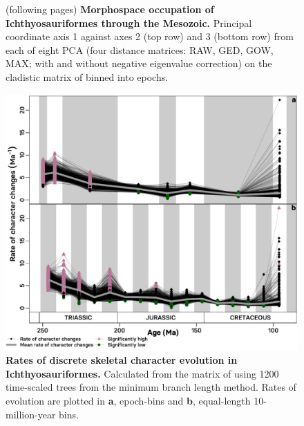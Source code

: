 \documentclass[british,a4paper]{article}
\begin{document}

\FloatBarrier

\begin{figure}[h]
    \caption[Morphospace occupation of Ichthyosauriformes through the Mesozoic]{(following pages) \textbf{Morphospace occupation of Ichthyosauriformes through the Mesozoic.} Principal coordinate axis 1 against axes 2 (top row) and 3 (bottom row) from each of eight PCA (four distance matrices: RAW, GED, GOW, MAX; with and without negative eigenvalue correction) on the cladistic matrix of \textcite{Moon2019a} binned into epochs.\label{fig:morphospace-plots}}
\end{figure}
\FloatBarrier




\begin{figure}[h]
    \includegraphics[width = \textwidth, center]{supp_figures/figS8-rates_MBLspaghetti}
    \caption[Rates of discrete skeletal character evolution in Ichthyosauriformes]{\textbf{Rates of discrete skeletal character evolution in Ichthyosauriformes.} Calculated from the matrix of \textcite{Moon2019a} using 1200 time-scaled trees from the minimum branch length method. Rates of evolution are plotted in \textbf{a}, epoch-bins and \textbf{b}, equal-length 10-million-year bins. \label{fig:mbl-discrete-rates}} 
\end{figure}
 
\end{document}
